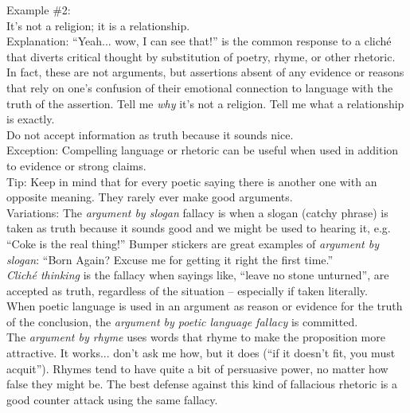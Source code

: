\documentclass[a4paper,12pt,single,pdftex]{scrartcl}
\begin{document}
    
      Example \#2:
    \\

    
      It’s not a religion; it is a relationship.
    \\

    
      Explanation: “Yeah... wow, I can see that!” is the common response to a cliché that diverts critical thought by substitution of poetry, rhyme, or other rhetoric.  In fact, these are not arguments, but assertions absent of any evidence or reasons that rely on one's confusion of their emotional connection to language with the truth of the assertion.  Tell me {\it why} it’s not a religion.  Tell me what a relationship is exactly. 
    \\

    
      Do not accept information as truth because it sounds nice.
    \\

    
      Exception: Compelling language or rhetoric can be useful when used in addition to evidence or strong claims.
    \\

    
      Tip: Keep in mind that for every poetic saying there is another one with an opposite meaning.  They rarely ever make good arguments.
    \\

    
      Variations: The {\it argument by slogan} fallacy is when a slogan (catchy phrase) is taken as truth because it sounds good and we might be used to hearing it, e.g. “Coke is the real thing!”  Bumper stickers are great examples of {\it argument by slogan}: “Born Again? Excuse me for getting it right the first time.”
    \\

    
      {\it Cliché thinking} is the fallacy when sayings like, “leave no stone unturned”, are accepted as truth, regardless of the situation -- especially if taken literally.
    \\

    
      When poetic language is used in an argument as reason or evidence for the truth of the conclusion, the {\it argument by poetic language fallacy}  is committed.
    \\

    
      The {\it argument by rhyme} uses words that rhyme to make the proposition more attractive.  It works... don’t ask me how, but it does (“if it doesn’t fit, you must acquit”).  Rhymes tend to have quite a bit of persuasive power, no matter how false they might be.  The best defense against this kind of fallacious rhetoric is a good counter attack using the same fallacy.
    \\
\end{document}
